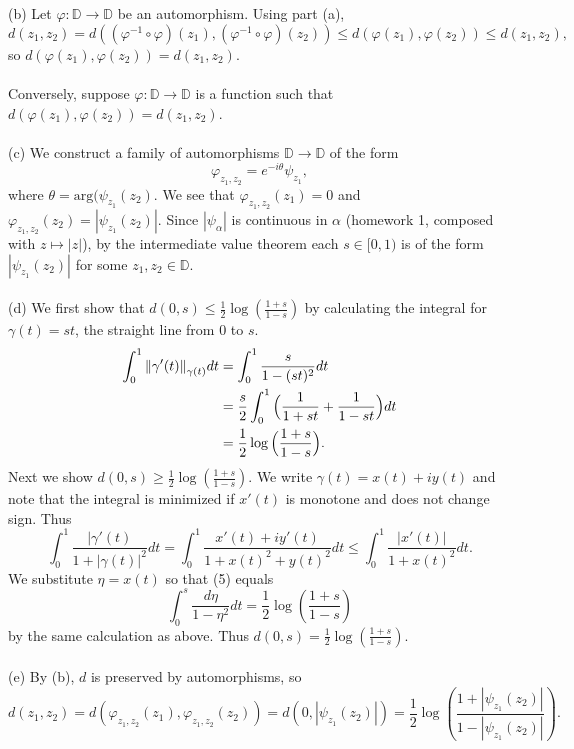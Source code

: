 \documentclass{article}
\newcommand{\D}{\mathbb{D}}
\begin{document}
\\ \\
(b) Let $\varphi:\D \to \D$ be an automorphism. Using part (a),
$$
d(z_1,z_2) = d((\varphi^{-1} \circ \varphi)(z_1), (\varphi^{-1} \circ \varphi)(z_2)) \leq d(\varphi(z_1),\varphi(z_2)) \leq d(z_1,z_2),
$$
so $d(\varphi(z_1),\varphi(z_2)) = d(z_1,z_2)$. \\ \\Conversely, suppose $\varphi:\D \to \D$ is a function such that $d(\varphi(z_1),\varphi(z_2)) = d(z_1,z_2)$.  
\\ \\
(c) We construct a family of automorphisms $\D \to \D$ of the form
$$\varphi_{z_1,z_2} = e^{-i\theta}\psi_{z_1},$$ where $\theta = \text{arg}(\psi_{z_1}(z_2)$. We see that $\varphi_{z_1,z_2}(z_1) = 0$ and $\varphi_{z_1,z_2}(z_2) = |\psi_{z_1}(z_2)|$. Since $|\psi_{\alpha}|$ is continuous in $\alpha$ (homework 1, composed with $z\mapsto |z|$), by the intermediate value theorem each $s \in [0,1)$ is of the form $|\psi_{z_1}(z_2)|$ for some $z_1, z_2 \in \D$.  
\\ \\
(d) We first show that $d(0,s) \leq \frac{1}{2} \log (\frac{1+s}{1-s})$ by calculating the integral for $\gamma(t) = st$, the straight line from 0 to $s$. 
\begin{align*}
    \int_0^1 \norm{\gamma'(t)}_{\gamma(t)} dt &= \int_0^1 \frac{s}{1-(st)^2}dt \\
    &=\frac{s}{2}\int_0^1 \Big(\frac{1}{1+st} + \frac{1}{1-st}\Big)dt \\
    &= \frac{1}{2} \log \Big(\frac{1+s}{1-s}\Big).
\end{align*}
Next we show $d(0,s) \geq \frac{1}{2}\log (\frac{1+s}{1-s})$. We write $\gamma(t) = x(t)+iy(t)$ and note that the integral is minimized if $x'(t)$ is monotone and does not change sign. Thus 
\begin{equation}
\int_0^1 \frac{|\gamma'(t)}{1+|\gamma(t)|^2}dt = \int_0^1 \frac{x'(t) + iy'(t)}{1+x(t)^2+y(t)^2}dt \leq \int_0^1 \frac{|x'(t)|}{1+x(t)^2}dt.
\end{equation}
We substitute $\eta = x(t)$ so that (5)
equals 
$$
\int_0^s \frac{d\eta}{1-\eta^2}dt = \frac{1}{2}\log(\frac{1+s}{1-s})
$$
by the same calculation as above. Thus $d(0,s) = \frac{1}{2}\log(\frac{1+s}{1-s}).$
\\ \\
(e) By (b), $d$ is preserved by automorphisms, so 
$$
d(z_1,z_2) = d(\varphi_{z_1,z_2}(z_1),\varphi_{z_1,z_2}(z_2)) = d(0,|\psi_{z_1}(z_2)|) = \frac{1}{2}\log(\frac{1+|\psi_{z_1}(z_2)|}{1-|\psi_{z_1}(z_2)|}).
$$
\end{document}

